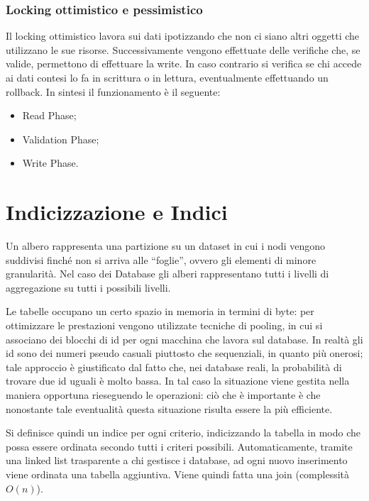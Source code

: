 \subsubsection{Locking ottimistico e pessimistico}

Il locking ottimistico lavora sui dati ipotizzando che non ci siano altri oggetti che utilizzano le sue risorse. Successivamente vengono effettuate delle verifiche che, se valide, permettono di effettuare la write. In caso contrario si verifica se chi accede ai dati contesi lo fa in scrittura o in lettura, eventualmente effettuando un rollback.
In sintesi il funzionamento è il seguente:
 
\begin{itemize}
 
\item Read Phase;
\item Validation Phase;
\item Write Phase.  

\end{itemize}


\section{Indicizzazione e Indici}

Un albero rappresenta una partizione su un dataset in cui i nodi vengono suddivisi finché non si arriva alle “foglie”, ovvero gli elementi di minore granularità. Nel caso dei Database gli alberi rappresentano tutti i livelli di aggregazione su tutti i possibili livelli.

Le tabelle occupano un certo spazio in memoria in termini di byte: per ottimizzare le prestazioni vengono utilizzate tecniche di pooling, in cui si associano dei blocchi di id per ogni macchina che lavora sul database. In realtà gli id sono dei numeri pseudo casuali piuttosto che sequenziali, in quanto più onerosi; tale approccio è giustificato dal fatto che, nei database reali, la probabilità di trovare due id uguali è molto bassa. In tal caso la situazione viene gestita nella maniera opportuna rieseguendo le operazioni: ciò che è importante è che nonostante tale eventualità questa situazione risulta essere la più efficiente.

Si definisce quindi un indice per ogni criterio, indicizzando la tabella in modo che possa essere ordinata secondo tutti i criteri possibili. Automaticamente, tramite una linked list trasparente a chi gestisce i database, ad ogni nuovo inserimento viene ordinata una tabella aggiuntiva. Viene quindi fatta una join (complessità $O(n)$).

